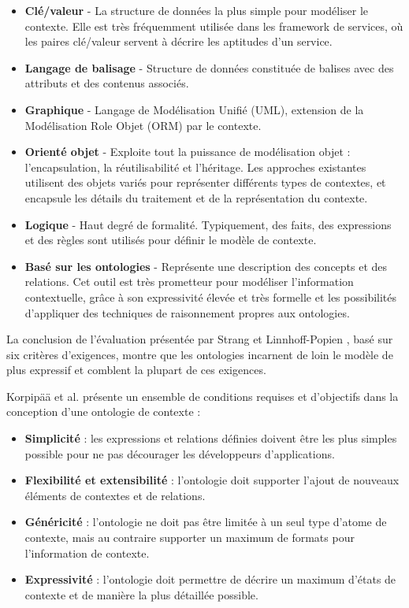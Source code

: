 \begin{itemize}
    \item \textbf{Clé/valeur} -
        La structure de données la plus simple pour modéliser le contexte.
        Elle est très fréquemment utilisée dans les framework de services,
        où les paires clé/valeur servent à décrire les aptitudes d'un
        service.
    \item \textbf{Langage de balisage} -
        Structure de données constituée de balises avec des attributs et des
        contenus associés. 
    \item \textbf{Graphique} -
        Langage de Modélisation Unifié (UML), extension de la Modélisation
        Role Objet (ORM) par le contexte.
    \item \textbf{Orienté objet} -
        Exploite tout la puissance de modélisation objet : l'encapsulation,
        la réutilisabilité et l'héritage. Les approches existantes utilisent
        des objets variés pour représenter différents types de contextes, et
        encapsule les détails du traitement et de la représentation du
        contexte.
    \item \textbf{Logique} -
	    Haut degré de formalité. Typiquement, des faits, des expressions
	    et des règles sont utilisés pour définir le modèle de contexte.
    \item \textbf{Basé sur les ontologies} -
	    Représente une description des concepts et des relations. Cet outil
	    est très prometteur pour modéliser l'information contextuelle, grâce
	    à son expressivité élevée et très formelle et les possibilités
	    d'appliquer des techniques de raisonnement propres aux ontologies.
\end{itemize}

La conclusion de l'évaluation présentée par Strang et Linnhoff-Popien
\cite{strang_context_2004}, basé sur six critères d'exigences, montre que les
ontologies incarnent de loin le modèle de plus expressif et comblent la plupart
de ces exigences.

Korpipää et al. \cite{korpipaa_ontology_2003} présente un ensemble de conditions
requises et d'objectifs dans la conception d'une ontologie de contexte :

\begin{itemize}
    \item \textbf{Simplicité} : 
    	les expressions et relations définies doivent être les plus simples
    	possible pour ne pas décourager les développeurs d'applications.
    \item \textbf{Flexibilité et extensibilité} :
        l'ontologie doit supporter l'ajout de nouveaux éléments de contextes
        et de relations.
    \item \textbf{Généricité} :
        l'ontologie ne doit pas être limitée à un seul type d'atome de
        contexte, mais au contraire supporter un maximum de formats pour
        l'information de contexte.
    \item \textbf{Expressivité} :
        l'ontologie doit permettre de décrire un maximum d'états de
        contexte et de manière la plus détaillée possible.
\end{itemize}

